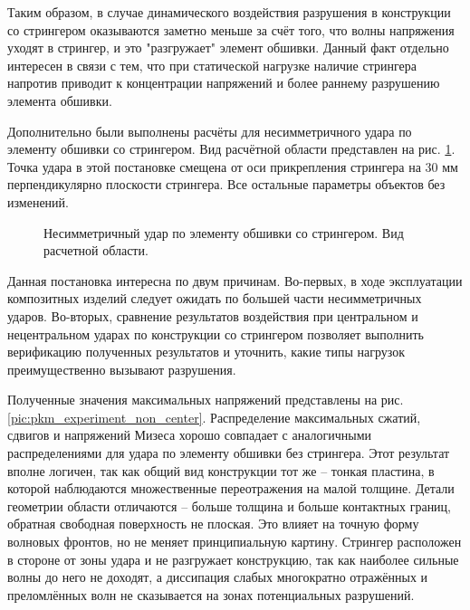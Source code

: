 Таким образом, в случае динамического воздействия разрушения в конструкции со стрингером оказываются заметно меньше за счёт того, что волны напряжения уходят в стрингер, и это "разгружает" элемент обшивки. Данный факт отдельно интересен в связи с тем, что при статической нагрузке наличие стрингера напротив приводит к концентрации напряжений и более раннему разрушению элемента обшивки.


\clearpage
\newpage


Дополнительно были выполнены расчёты для несимметричного удара по элементу обшивки со стрингером. Вид расчётной области представлен на рис. \ref{pic:wing_stringer_non_center_scene}. Точка удара в этой постановке смещена от оси прикрепления стрингера на 30 мм перпендикулярно плоскости стрингера. Все остальные параметры объектов без изменений.

\begin{figure}[htp]
\caption{Несимметричный удар по элементу обшивки со стрингером. Вид расчетной области.}
\label{pic:wing_stringer_non_center_scene}
\end{figure}

Данная постановка интересна по двум причинам. Во-первых, в ходе эксплуатации композитных изделий следует ожидать по большей части несимметричных ударов. Во-вторых, сравнение результатов воздействия при центральном и нецентральном ударах по конструкции со стрингером позволяет выполнить верификацию полученных результатов и уточнить, какие типы нагрузок преимущественно вызывают разрушения.

Полученные значения максимальных напряжений представлены на рис. \ref{pic:pkm_experiment_non_center}. Распределение максимальных сжатий, сдвигов и напряжений Мизеса хорошо совпадает с аналогичными распределениями для удара по элементу обшивки без стрингера. Этот результат вполне логичен, так как общий вид конструкции тот же -- тонкая пластина, в которой наблюдаются множественные переотражения на малой толщине. Детали геометрии области отличаются -- больше толщина и больше контактных границ, обратная свободная поверхность не плоская. Это влияет на точную форму волновых фронтов, но не меняет принципиальную картину. Стрингер расположен в стороне от зоны удара и не разгружает конструкцию, так как наиболее сильные волны до него не доходят, а диссипация слабых многократно отражённых и преломлённых волн не сказывается на зонах потенциальных разрушений.

